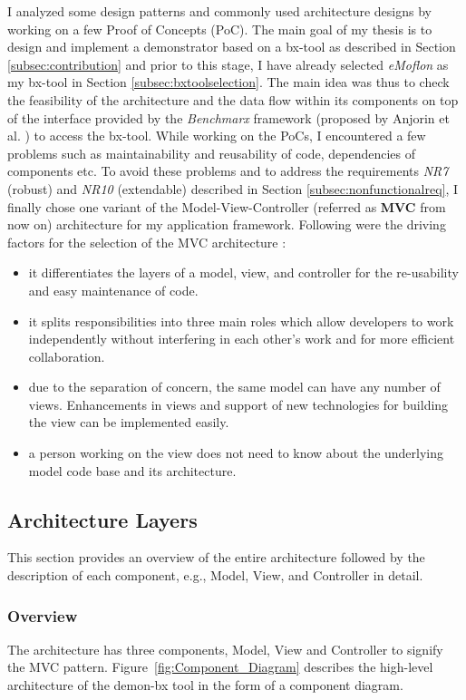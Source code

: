 I analyzed some design patterns and commonly used architecture designs by working on a few Proof of Concepts (PoC). The main goal of my thesis is to design and implement a demonstrator based on a bx-tool as described in Section \ref{subsec:contribution} and prior to this stage, I have already selected \textit{eMoflon} as my bx-tool in Section \ref{subsec:bxtoolselection}. The main idea was thus to check the feasibility of the architecture and the data flow within its components on top of the interface provided by the \textit{Benchmarx} framework (proposed by Anjorin et al. \cite{benchmarx-reload}) to access the bx-tool. While working on the PoCs, I encountered a few problems such as maintainability and reusability of code, dependencies of components etc. To avoid these problems and to address the requirements \textit{NR7} (robust) and \textit{NR10} (extendable) described in Section \ref{subsec:nonfunctionalreq}, I finally chose one variant of the Model-View-Controller (referred as \textbf{MVC} from now on) architecture for my application framework. Following were the driving factors for the selection of the MVC architecture \cite{designpattern-notes} \cite{designpattern-headfirst}:
\begin{itemize}
	\item {it differentiates the layers of a model, view, and controller for the re-usability and easy maintenance of code.}
	\item {it splits responsibilities into three main roles which allow developers to work independently without interfering in each other's work and for more efficient collaboration.}
	\item {due to the separation of concern, the same model can have any number of views. Enhancements in views and support of new technologies for building the view can be implemented easily.}
	\item {a person working on the view does not need to know about the underlying model code base and its architecture.}
\end{itemize}

\subsection{Architecture Layers}\label{subsec:design_layers}
This section provides an overview of the entire architecture followed by the description of each component, e.g., Model, View, and Controller in detail.

\subsubsection{Overview}\label{subsubsec:design_overview}
The architecture has three components, Model, View and Controller to signify the MVC pattern. Figure~\ref{fig:Component_Diagram} describes the high-level architecture of the demon-bx tool in the form of a component diagram.
       
